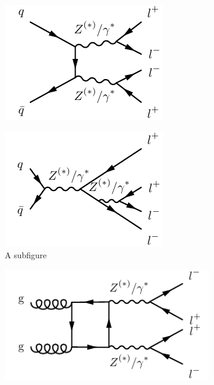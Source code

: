 \begin{figure}
\centering
\begin{subfigure}{.24\textwidth}
  \centering
  \includegraphics[width=.99\textwidth]{Figures/FeynGraphs/qqZZ4l.pdf}
  \caption{\qqZZ}
  \label{fig:m4lfeynman:qqZZ}
\end{subfigure}%
\begin{subfigure}{.24\textwidth}
  \centering
  \includegraphics[width=.99\textwidth]{Figures/FeynGraphs/qqZZ4lrad.pdf}
  \caption{A subfigure}
  \label{fig:m4lfeynman:singleZ}
\end{subfigure}
\begin{subfigure}{.24\textwidth}
  \centering
  \includegraphics[width=.99\textwidth]{Figures/FeynGraphs/ggZZ4lbox.pdf}

\end{subfigure}
\end{figure}
